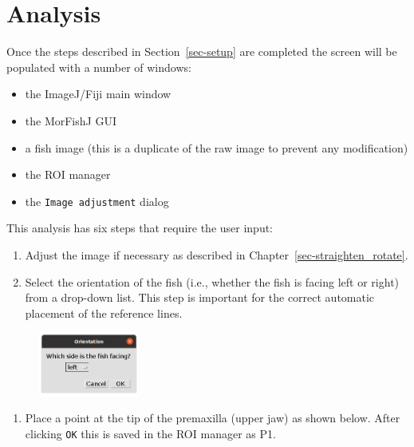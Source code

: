 \documentclass[
  letterpaper,
]{scrbook}
\providecommand{\tightlist}{%
  \setlength{\itemsep}{0pt}\setlength{\parskip}{0pt}}\usepackage{longtable,booktabs,array}
\begin{document}
\hypertarget{analysis-1}{%
\section{Analysis}\label{analysis-1}}

Once the steps described in Section~\ref{sec-setup} are completed the
screen will be populated with a number of windows:

\begin{itemize}
\tightlist
\item
  the ImageJ/Fiji main window
\item
  the MorFishJ GUI
\item
  a fish image (this is a duplicate of the raw image to prevent any
  modification)
\item
  the ROI manager
\item
  the \texttt{Image\ adjustment} dialog
\end{itemize}

This analysis has six steps that require the user input:

\begin{enumerate}
\def\labelenumi{\arabic{enumi}.}
\item
  Adjust the image if necessary as described in
  Chapter~\ref{sec-straighten_rotate}.
\item
  Select the orientation of the fish (i.e., whether the fish is facing
  left or right) from a drop-down list. This step is important for the
  correct automatic placement of the reference lines.
\end{enumerate}

\begin{figure}

{\centering \includegraphics[width=0.3\textwidth,height=\textheight]{./images/screenshots/orientation.png}

}

\end{figure}

\begin{enumerate}
\def\labelenumi{\arabic{enumi}.}
\setcounter{enumi}{2}
\tightlist
\item
  Place a point at the tip of the premaxilla (upper jaw) as shown below.
  After clicking \texttt{OK} this is saved in the ROI manager as P1.
\end{enumerate}
\end{document}
